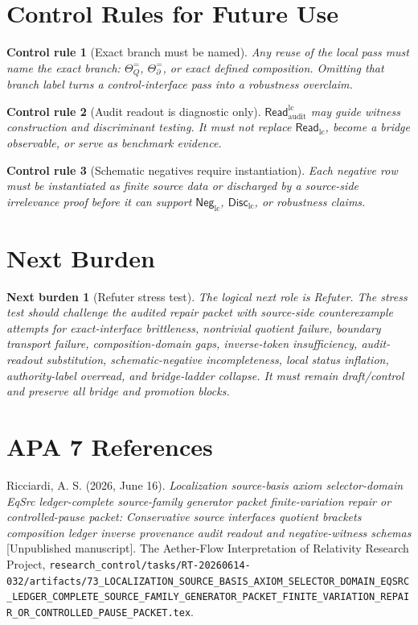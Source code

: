 \documentclass[11pt]{article}
\newcommand{\ReadLC}{\mathsf{Read}_{\mathrm{lc}}}
\newcommand{\ReadAudit}{\mathsf{Read}_{\mathrm{audit}}^{\mathrm{lc}}}
\newcommand{\DiscLC}{\mathsf{Disc}_{\mathrm{lc}}}
\newcommand{\NegLC}{\mathsf{Neg}_{\mathrm{lc}}}
\newtheorem{controlrule}{Control rule}
\newtheorem{nextburden}{Next burden}
\begin{document}
\section{Control Rules for Future Use}

\begin{controlrule}[Exact branch must be named]
Any reuse of the local pass must name the exact branch:
\(\Theta_Q^{=}\), \(\Theta_{\partial}^{=}\), or exact defined
composition. Omitting that branch label turns a control-interface pass
into a robustness overclaim.
\end{controlrule}

\begin{controlrule}[Audit readout is diagnostic only]
\(\ReadAudit\) may guide witness construction and discriminant testing.
It must not replace \(\ReadLC\), become a bridge observable, or serve
as benchmark evidence.
\end{controlrule}

\begin{controlrule}[Schematic negatives require instantiation]
Each negative row must be instantiated as finite source data or
discharged by a source-side irrelevance proof before it can support
\(\NegLC\), \(\DiscLC\), or robustness claims.
\end{controlrule}

\section{Next Burden}

\begin{nextburden}[Refuter stress test]
The logical next role is Refuter. The stress test should challenge the
audited repair packet with source-side counterexample attempts for
exact-interface brittleness, nontrivial quotient failure, boundary
transport failure, composition-domain gaps, inverse-token
insufficiency, audit-readout substitution, schematic-negative
incompleteness, local status inflation, authority-label overread, and
bridge-ladder collapse. It must remain draft/control and preserve all
bridge and promotion blocks.
\end{nextburden}

\section*{APA 7 References}

Ricciardi, A. S. (2026, June 16). \emph{Localization source-basis axiom
selector-domain EqSrc ledger-complete source-family generator packet
finite-variation repair or controlled-pause packet: Conservative
source interfaces quotient brackets composition ledger inverse
provenance audit readout and negative-witness schemas} [Unpublished
manuscript]. The Aether-Flow Interpretation of Relativity Research
Project,
\texttt{research\_control/tasks/RT-20260614-032/artifacts/73\_LOCALIZATION\_SOURCE\_BASIS\_AXIOM\_SELECTOR\_DOMAIN\_EQSRC\_LEDGER\_COMPLETE\_SOURCE\_FAMILY\_GENERATOR\_PACKET\_FINITE\_VARIATION\_REPAIR\_OR\_CONTROLLED\_PAUSE\_PACKET.tex}.
\end{document}
